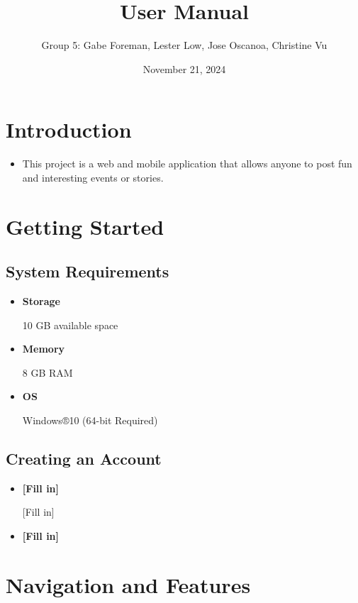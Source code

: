 \documentclass{article}
\title{User Manual}
\author{Group 5: Gabe Foreman, Lester Low, Jose Oscanoa, Christine Vu}
\date{November 21, 2024}
\begin{document}
\maketitle
\tableofcontents
\newpage

\section{Introduction}
    \begin{itemize}
    \item This project is a web and mobile application that allows anyone to post fun and interesting events or stories.

    \end{itemize}

\section{Getting Started}
\subsection{System Requirements}
\begin{itemize}
    \item \textbf{Storage}         
            
            10 GB available space
            
    \item \textbf{Memory} 
            
            8 GB RAM
            
    \item \textbf{OS}
            
            Windows®10 (64-bit Required)

\end{itemize}

\subsection{Creating an Account}
\begin{itemize}
    \item \textbf{[Fill in]}

            [Fill in]

    \item \textbf{[Fill in]}
    

\end{itemize}

\section{Navigation and Features}
\end{document}
